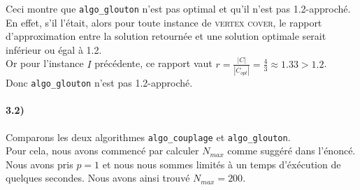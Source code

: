 \documentclass[12pt]{article}
\begin{document}
        Ceci montre que \texttt{algo\_glouton} n'est pas optimal et qu'il n'est pas 1.2-approché. \\
        En effet, s'il l'était, alors pour toute instance de \textsc{vertex cover}, le rapport d'approximation entre la solution retournée et une solution optimale serait inférieur ou égal à 1.2. \\
        Or pour l'instance $I$ précédente, ce rapport vaut $r = \frac{|C|}{|C_{opt}|} = \frac{4}{3} \approx 1.33 > 1.2$. \\
        Donc \texttt{algo\_glouton} n'est pas 1.2-approché.

    \paragraph{3.2)}
        Comparons les deux algorithmes \texttt{algo\_couplage} et \texttt{algo\_glouton}. \\
        Pour cela, nous avons commencé par calculer $N_{max}$ comme suggéré dans l'énoncé. Nous avons pris $p = 1$ et nous nous sommes limités à un temps d'éxécution de quelques secondes. Nous avons ainsi trouvé $N_{max} = 200$.
\end{document}
